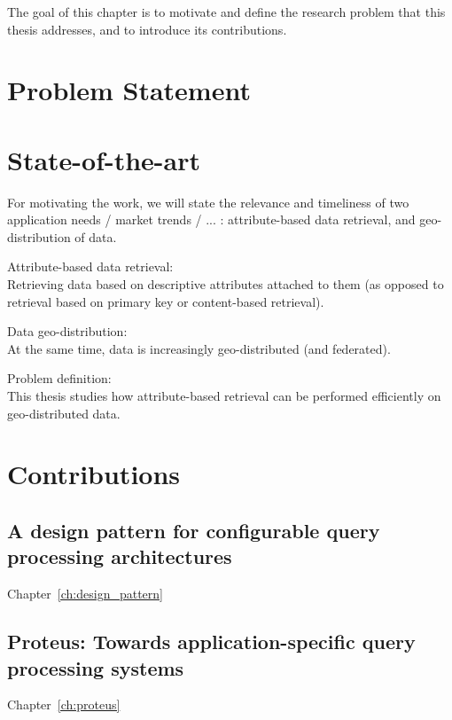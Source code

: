 The goal of this chapter is to motivate and define the research problem that
this thesis addresses, and to introduce its contributions.

\section{Problem Statement}

\section{State-of-the-art}

For motivating the work, we will state the relevance and timeliness of two
application needs / market trends / ... : attribute-based data retrieval, and
geo-distribution of data.

Attribute-based data retrieval: \\
Retrieving data based on descriptive attributes attached to them (as opposed to
retrieval based on primary key or content-based retrieval).

Data geo-distribution: \\
At the same time, data is increasingly geo-distributed (and federated).

Problem definition: \\
This thesis studies how attribute-based retrieval can be performed efficiently
on geo-distributed data.


\section{Contributions}
\subsection{A design pattern for configurable query processing architectures}
Chapter~\ref{ch:design_pattern}

\subsection{Proteus: Towards application-specific query processing systems}
Chapter~\ref{ch:proteus}